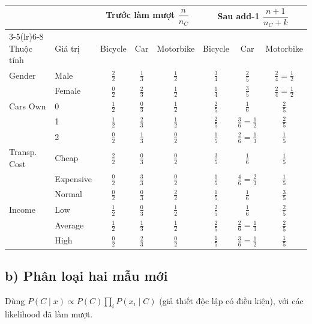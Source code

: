 \documentclass[a4paper,11pt]{article}
\renewcommand{\arraystretch}{1.25}
\begin{document}
\begin{center}
\small
\renewcommand{\arraystretch}{1.5}
\begin{tabular}{@{}ll ccc ccc@{}}
\toprule
 & & \multicolumn{3}{c}{Trước làm mượt $\dfrac{n}{n_C}$} & \multicolumn{3}{c}{Sau add-1 $\dfrac{n+1}{n_C+k}$} \\
\cmidrule(lr){3-5}\cmidrule(lr){6-8}
Thuộc tính & Giá trị & Bicycle & Car & Motorbike & Bicycle & Car & Motorbike \\
\midrule
Gender & Male   & $\frac22$ & $\frac13$ & $\frac12$ & $\frac34$ & $\frac25$ & $\frac24=\frac12$ \\
       & Female & $\frac02$ & $\frac23$ & $\frac12$ & $\frac14$ & $\frac35$ & $\frac24=\frac12$ \\
\midrule
Cars Own & 0 & $\frac12$ & $\frac03$ & $\frac12$ & $\frac25$ & $\frac16$ & $\frac25$ \\
         & 1 & $\frac12$ & $\frac23$ & $\frac12$ & $\frac25$ & $\frac36=\frac12$ & $\frac25$ \\
         & 2 & $\frac02$ & $\frac13$ & $\frac02$ & $\frac15$ & $\frac26=\frac13$ & $\frac15$ \\
\midrule
Transp. Cost & Cheap     & $\frac22$ & $\frac03$ & $\frac02$ & $\frac35$ & $\frac16$ & $\frac15$ \\
             & Expensive & $\frac02$ & $\frac33$ & $\frac02$ & $\frac15$ & $\frac46=\frac23$ & $\frac15$ \\
             & Normal    & $\frac02$ & $\frac03$ & $\frac22$ & $\frac15$ & $\frac16$ & $\frac35$ \\
\midrule
Income & Low     & $\frac12$ & $\frac03$ & $\frac12$ & $\frac25$ & $\frac16$ & $\frac25$ \\
       & Average & $\frac12$ & $\frac13$ & $\frac12$ & $\frac25$ & $\frac26=\frac13$ & $\frac25$ \\
       & High    & $\frac02$ & $\frac23$ & $\frac02$ & $\frac15$ & $\frac36=\frac12$ & $\frac15$ \\
\bottomrule
\end{tabular}
\end{center}

\subsection*{b) Phân loại hai mẫu mới}
Dùng $P(C\mid x)\propto P(C)\prod_i P(x_i\mid C)$ (giả thiết độc lập có điều kiện), với các likelihood đã làm mượt.
\end{document}
